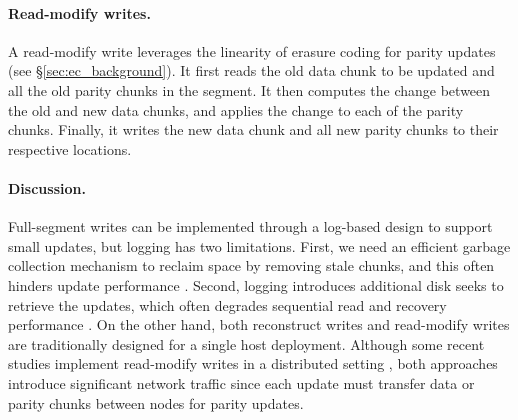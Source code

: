 \paragraph{Read-modify writes.} A read-modify write leverages the linearity of
erasure coding for parity updates (see \S\ref{sec:ec_background}).  It first
reads the old data chunk to be updated and all the old parity chunks in the
segment.  It then computes the change between the old and new data chunks, and
applies the change to each of the parity chunks. 
Finally, it writes the new data chunk and all new parity chunks to their
respective locations. 

\paragraph{Discussion.}  Full-segment writes can be implemented through a
log-based design to support small updates, but logging has two limitations.
First, we need an efficient garbage collection mechanism to reclaim space by
removing stale chunks, and this often hinders update performance
\cite{seltzer95}. Second, logging introduces additional disk seeks to retrieve
the updates, which often degrades sequential read and recovery performance
\cite{matthews97}. 
On the other hand, both reconstruct writes and read-modify writes 
are traditionally designed for a single host deployment. Although some recent
studies implement read-modify writes in a distributed setting
\cite{frolund04,zhang12}, both approaches
introduce significant network traffic since each update must transfer data or
parity chunks between nodes for parity updates. 



